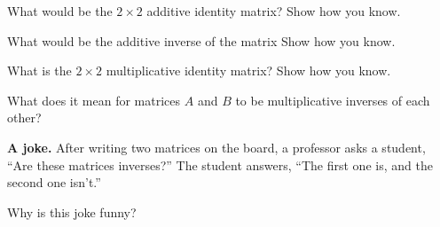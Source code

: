 \documentclass{ximera}
\begin{document}
\begin{question}
What would be the $2\times 2$ additive identity matrix?  Show how you
know.
\begin{freeResponse}
\end{freeResponse}
\end{question}

\begin{question}
What would be the additive inverse of the matrix 
Show how you know.  
\begin{freeResponse}
\end{freeResponse}
\end{question}

\begin{question}
What is the $2\times 2$ multiplicative identity matrix?  Show how you know.
\begin{freeResponse}
\end{freeResponse}
\end{question}

\begin{question}
What does it mean for matrices $A$ and $B$ to be multiplicative inverses of each other?  
\begin{freeResponse}
\end{freeResponse}
\end{question}

\textbf{A joke.}  After writing two matrices on the board, a professor asks a student, ``Are these matrices inverses?''  The student answers, ``The first one is, and the second one isn't.''  
\begin{question}
Why is this joke funny?  
\begin{freeResponse}
\end{freeResponse}
\end{question}
\end{document}
